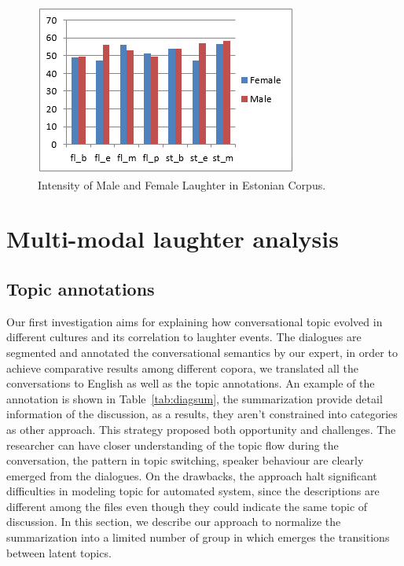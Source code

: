\documentclass[10pt,journal,compsoc]{IEEEtran}
\begin{document}
\begin{figure}[!t]
\centering
\includegraphics[width=1\linewidth]{images/Intensity-MINT.png}
\caption{Intensity of Male and Female Laughter in Estonian Corpus.}
\label{fig:intensity-estonian}
\end{figure}

\section{Multi-modal laughter analysis}
\label{sec:multi-modal laughter analysis}

\subsection{Topic annotations}
\label{sec:topic-annotations}
Our first investigation aims for explaining how conversational topic evolved in different cultures and its correlation to laughter events.
The dialogues are segmented and annotated the conversational semantics by our expert, in order to achieve comparative results among different copora, we translated all the conversations to English as well as the topic annotations. An example of the annotation is shown in Table~\ref{tab:diagsum}, the summarization provide detail information of the discussion, as a results, they aren't constrained into categories as other approach. This strategy proposed both opportunity and challenges. The researcher can have closer understanding of the topic flow during the conversation, the pattern in topic switching, speaker behaviour are clearly emerged from the dialogues. On the drawbacks, the approach halt significant difficulties in modeling topic for automated system, since the descriptions are different among the files even though they could indicate the same topic of discussion. In this section, we describe our approach to normalize the summarization into a limited number of group in which emerges the transitions between latent topics.
\end{document}
